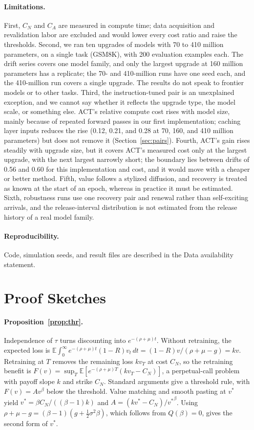 \documentclass[acmsmall,review]{acmart}
\newcommand{\E}{\mathbb{E}}
\begin{document}
\paragraph{Limitations.} First, $C_N$ and $C_A$ are measured in compute time; data acquisition and revalidation labor
are excluded and would lower every cost ratio and raise the thresholds. Second, we ran ten upgrades of models with 70 to 410 million parameters, on a single task (GSM8K), with 200 evaluation examples each. The drift series covers one model family, and only the largest upgrade at 160 million parameters has a replicate; the 70- and 410-million runs have one seed each, and the 410-million run covers a single upgrade. The results do not speak to frontier models or to other tasks.
Third, the instruction-tuned pair is an unexplained exception, and we cannot say whether it reflects the upgrade type, the model scale, or something else. ACT's relative compute cost rises with model size, mainly because of repeated forward passes in our first implementation; caching layer inputs reduces the rise (0.12, 0.21, and 0.28 at 70, 160, and 410 million parameters) but does not remove it (Section~\ref{sec:pairs}). Fourth, ACT's gain rises steadily with upgrade size, but it covers ACT's measured cost only at the largest upgrade, with the next largest narrowly short; the boundary lies between drifts of 0.56 and 0.60 for this implementation and cost, and it would move with a cheaper or better method. Fifth, value follows a stylized diffusion, and recovery is treated as known at the start of an epoch, whereas in
practice it must be estimated. Sixth, robustness runs use one recovery pair and renewal rather than self-exciting arrivals, and the release-interval distribution is not estimated from the release history of a real model family.

\paragraph{Reproducibility.} Code, simulation seeds, and result files are described in the Data availability statement.

\appendix
\section{Proof Sketches}\label{app:proofs}

\paragraph{Proposition~\ref{prop:thr}.} Independence of $\tau$ turns discounting into $e^{-(\rho+\mu)t}$. Without
retraining, the expected loss is $\E\int_0^\infty e^{-(\rho+\mu)t}(1-R)v_t\,dt=(1-R)v/(\rho+\mu-g)=kv$. Retraining at $T$
removes the remaining loss $kv_T$ at cost $C_N$, so the retraining benefit is
$F(v)=\sup_T\E[e^{-(\rho+\mu)T}(kv_T-C_N)]$, a perpetual-call problem with payoff slope $k$ and strike $C_N$. Standard
arguments \citep{dixit1994investment} give a threshold rule, with $F(v)=Av^\beta$ below the threshold. Value matching
and smooth pasting at $v^*$ yield $v^*=\beta C_N/((\beta-1)k)$ and $A=(kv^*-C_N)/{v^*}^\beta$. Using
$\rho+\mu-g=(\beta-1)(g+\tfrac12\sigma^2\beta)$, which follows from $Q(\beta)=0$, gives the second form of $v^*$.
\end{document}
